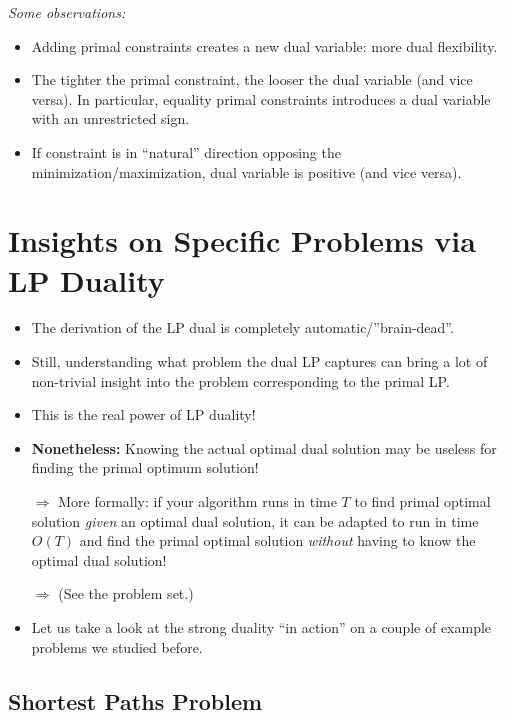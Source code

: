 \documentclass{article}
\begin{document}
{\em Some observations:}
\begin{itemize}
\item Adding primal constraints creates a new dual variable: more dual
  flexibility.
  \item The tighter the primal constraint, the looser the dual variable (and vice versa). In particular, equality primal constraints introduces a dual variable with an unrestricted sign.
\item If constraint is in ``natural'' direction opposing the minimization/maximization, dual variable is positive (and vice versa).
\end{itemize}

\section{Insights on Specific Problems via LP Duality}

\begin{itemize}
\item The derivation of the LP dual is completely automatic/''brain-dead''.
\item Still,  understanding what problem the dual LP captures can bring a lot of non-trivial insight into the problem corresponding to the primal LP. 
\item This is the real power of LP duality!
\item {\bf Nonetheless:} Knowing the actual optimal dual solution may be useless for finding the primal optimum solution! 

$\Rightarrow$ More formally: if your algorithm runs in time $T$ to find primal optimal solution {\em given} an optimal dual solution, it can be adapted to run in time $O(T)$ and find the primal optimal solution {\em without} having to know the optimal dual solution!

$\Rightarrow$ (See the problem set.)

\item Let us take a look at the strong duality ``in action'' on a couple of example problems we studied before.
\end{itemize}


\subsection{Shortest Paths Problem}
\end{document}
